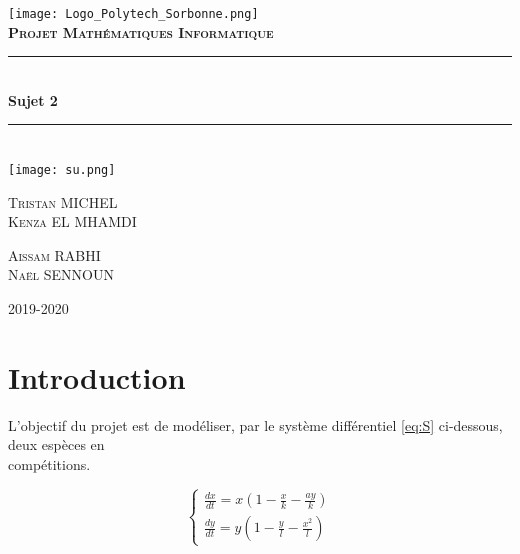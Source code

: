 \documentclass{article}
\newcommand{\HRule}{\rule{\linewidth}{0.5mm}}
\begin{document}

\begin{titlepage}
    \begin{sffamily}
        \begin{center}
            \texttt{[image: Logo\_Polytech\_Sorbonne.png]}\\[1.5cm]
            \textsc{\Large \bfseries{Projet Mathématiques Informatique}}\\[1.5cm]
            \HRule \\[0.4cm]
            { \huge \bfseries Sujet 2\\[0.4cm]}
            \HRule \\[2cm]
            \texttt{[image: su.png]}\\[2cm]
            \begin{minipage}{0.4\textwidth}
                \begin{flushleft} \large
                    \textsc{Tristan MICHEL\\ Kenza EL MHAMDI }
                \end{flushleft}
            \end{minipage}
            \begin{minipage}{0.4\textwidth}
                \begin{flushright} \large
                    \textsc{Aissam RABHI\\ Naël SENNOUN}
                \end{flushright}
            \end{minipage}
            \vfill
        
            {\large 2019-2020}
            
        \end{center}
    \end{sffamily}
\end{titlepage}

\tableofcontents
\newpage

\section*{Introduction}
L'objectif du projet est de modéliser, par le système différentiel \eqref{eq:S} ci-dessous, deux espèces en \\compétitions.

\begin{equation}
\tag{S}
\label{eq:S}
\left\{
\begin{array}{ll}
    \frac{dx}{dt} =  x(1 - \frac{x}{k} - \frac{a y}{k}) \\
    \frac{dy}{dt} = y(1- \frac{y}{l} - \frac{x^{2}}{l})
\end{array}
\right.
\end{equation}\\
\end{document}
